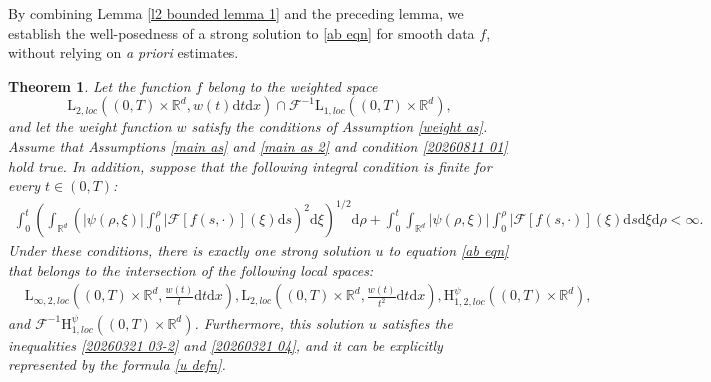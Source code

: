 \documentclass[11pt,reqno]{amsart}
\newtheorem{thm}{Theorem}[section]
\theoremstyle{definition}
\theoremstyle{remark}
\newcommand\bR{\mathbb{R}}
\newcommand\cF{\mathcal{F}}
\numberwithin{equation}{section}
\begin{document}
By combining Lemma \ref{l2 bounded lemma 1} and the preceding lemma, we establish the well-posedness of a strong solution to \eqref{ab eqn} for smooth data $f$, without relying on \textit{a priori} estimates.

\begin{thm}
										\label{strong solution thm}
Let the function $f$ belong to the weighted space 
$$
\mathrm{L}_{2,loc}\left( (0,T) \times \bR^d, w(t)\mathrm{d}t \mathrm{d}x \right)\cap \cF^{-1}\mathrm{L}_{1,loc}\left( (0,T) \times \bR^d\right), 
$$
and let the weight function $w$ satisfy the conditions of Assumption \ref{weight as}. Assume that Assumptions \ref{main as} and \ref{main as 2} and condition \eqref{20260811 01} hold true. In addition, suppose that the following integral condition is finite for every $t \in (0,T)$:
\begin{align}
									\label{20260401 01}
\int_0^t  \left(\int_{\bR^d}  \left( |\psi(\rho,\xi)| \int_0^\rho |\cF[f(s,\cdot)](\xi) \mathrm{d}s\right)^2  \mathrm{d}\xi \right)^{1/2} \mathrm{d}\rho
+\int_0^t  \int_{\bR^d}   |\psi(\rho,\xi)| \int_0^\rho |\cF[f(s,\cdot)](\xi) \mathrm{d}s  \mathrm{d}\xi \mathrm{d}\rho
<\infty.
\end{align}
Under these conditions, there is exactly one strong solution $u$ to equation \eqref{ab eqn} that belongs to the intersection of the following local spaces:
$$
\begin{aligned}
&\mathrm{L}_{\infty,2, loc}\left( (0,T) \times \bR^d ,\frac{w(t)}{t}\mathrm{d}t \mathrm{d}x\right), \mathrm{L}_{2, loc}\left( (0,T) \times \bR^d,\frac{w(t)}{t^2}\mathrm{d}t\mathrm{d}x \right), \mathrm{H}_{1,2,loc}^{\psi}\left( (0,T) \times \bR^d\right)
, 
\end{aligned}
$$
and $\cF^{-1}\mathrm{H}_{1,loc}^{\psi}\left( (0,T) \times \bR^d\right)$.
Furthermore, this solution $u$ satisfies the inequalities \eqref{20260321 03-2} and \eqref{20260321 04}, and it can be explicitly represented by the formula \eqref{u defn}.


\end{thm}
\end{document}
